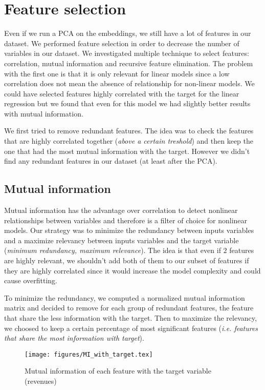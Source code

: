 \section{Feature selection}

Even if we run a PCA on the embeddings, we still have a lot of features in our dataset. We performed feature selection in order to decrease the number of variables in our dataset. We investigated multiple technique to select features: correlation, mutual information and recursive feature elimination. The problem with the first one is that it is only relevant for linear models since a low correlation does not mean the absence of relationship for non-linear models. We could have selected features highly correlated with the target for the linear regression but we found that even for this model we had slightly better results with mutual information.

We first tried to remove redundant features. The idea was to check the features that are highly correlated together (\textit{above a certain treshold}) and then keep the one that had the most mutual information with the target. However we didn't find any redundant features in our dataset (at least after the PCA).

\subsection{Mutual information}

Mutual information has the advantage over correlation to detect nonlinear relationships between variables and therefore is a filter of choice for nonlinear models. Our strategy was to minimize the redundancy between inputs variables and a maximize relevancy between inputs variables and the target variable (\textit{minimum redundancy, maximum relevance}). The idea is that even if $2$ features are highly relevant, we shouldn't add both of them to our subset of features if they are highly correlated since it would increase the model complexity and could cause overfitting.

To minimize the redundancy, we computed a normalized mutual information matrix and decided to remove for each group of redundant features, the feature that share the less information with the target.
Then to maximize the relevancy, we choosed to keep a certain percentage of most significant features (\textit{i.e. features that share the most information with target}).

\begin{figure}[H]
	\centering
	\texttt{[image: figures/MI\_with\_target.tex]}
	\caption{Mutual information of each feature with the target variable (revenues)}
	\label{fig:MI_with_target}
\end{figure}

